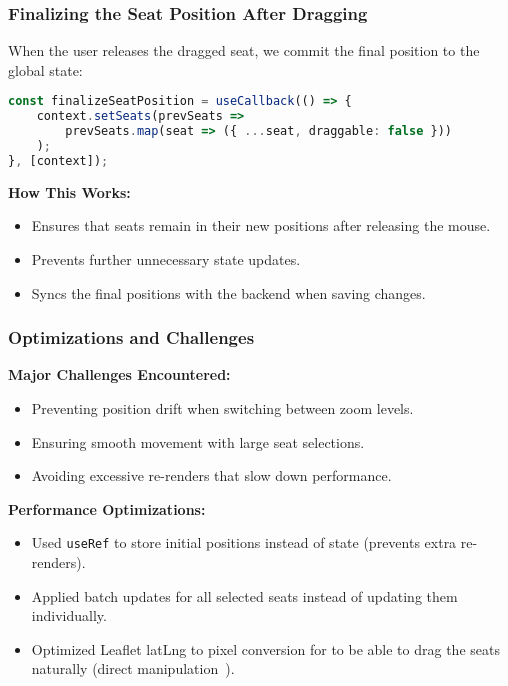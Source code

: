 \subsubsection{Finalizing the Seat Position After Dragging}
When the user releases the dragged seat, we commit the final position to the global state:

\begin{lstlisting}[language=TypeScript, caption=Finalizing Seat Position After Dragging, label=lst:seat-drop-final]
const finalizeSeatPosition = useCallback(() => {
    context.setSeats(prevSeats =>
        prevSeats.map(seat => ({ ...seat, draggable: false }))
    );
}, [context]);
\end{lstlisting}

\textbf{How This Works:}
\begin{itemize}
    \item Ensures that seats remain in their new positions after releasing the mouse.
    \item Prevents further unnecessary state updates.
    \item Syncs the final positions with the backend when saving changes.
\end{itemize}

\subsubsection{Optimizations and Challenges}
\textbf{Major Challenges Encountered:}
\begin{itemize}
    \item Preventing position drift when switching between zoom levels.
    \item Ensuring smooth movement with large seat selections.
    \item Avoiding excessive re-renders that slow down performance.
\end{itemize}

\textbf{Performance Optimizations:}
\begin{itemize}
    \item Used \texttt{useRef} to store initial positions instead of state (prevents extra re-renders).
    \item Applied batch updates for all selected seats instead of updating them individually.
    \item Optimized Leaflet latLng to pixel conversion for to be able to drag the seats naturally (direct manipulation~\cite{Hutchins01121985}).
\end{itemize}


